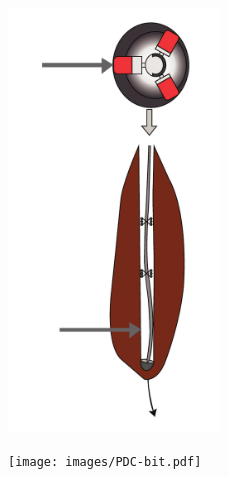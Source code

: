\documentclass{beamer}
\begin{document}
\begin{frame}
\begin{columns}
\begin{column}{0.4\textwidth}
\begin{figure}[ht]
\begin{minipage}[t]{1\textwidth}
				\hspace{0.5cm}	\includegraphics[width=0.5\textwidth]{images/RSS.pdf}
				\end{minipage}
				\begin{minipage}[b]{1\textwidth}
			\hspace{1.1cm} \texttt{[image: images/PDC-bit.pdf]}
			\end{minipage}
			\end{figure}			
		\end{column}
	\end{columns}
\end{frame}
\end{document}

